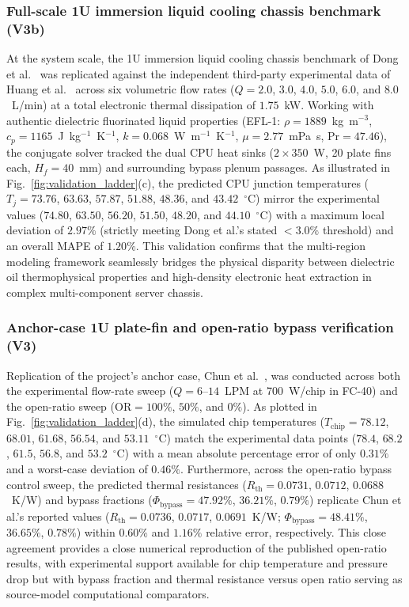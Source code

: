 \subsubsection{Full-scale 1U immersion liquid cooling chassis benchmark (V3b)}
\label{sec:vv-v3b-discussion}

At the system scale, the 1U immersion liquid cooling chassis benchmark of Dong et al.~\cite{dong2026} was replicated against the independent third-party experimental data of Huang et al.~\cite{huang2024energy} across six volumetric flow rates ($Q = 2.0$, $3.0$, $4.0$, $5.0$, $6.0$, and $8.0$~L/min) at a total electronic thermal dissipation of $1.75$~kW. Working with authentic dielectric fluorinated liquid properties (EFL-1: $\rho = 1889$~kg~m$^{-3}$, $c_p = 1165$~J~kg$^{-1}$~K$^{-1}$, $k = 0.068$~W~m$^{-1}$~K$^{-1}$, $\mu = 2.77$~mPa~s, $\mathrm{Pr} = 47.46$), the conjugate solver tracked the dual CPU heat sinks ($2 \times 350$~W, 20 plate fins each, $H_f = 40$~mm) and surrounding bypass plenum passages. As illustrated in Fig.~\ref{fig:validation_ladder}(c), the predicted CPU junction temperatures ($T_j = 73.76$, $63.63$, $57.87$, $51.88$, $48.36$, and $43.42$~$^{\circ}$C) mirror the experimental values ($74.80$, $63.50$, $56.20$, $51.50$, $48.20$, and $44.10$~$^{\circ}$C) with a maximum local deviation of $2.97\%$ (strictly meeting Dong et al.'s stated $<3.0\%$ threshold) and an overall MAPE of $1.20\%$. This validation confirms that the multi-region modeling framework seamlessly bridges the physical disparity between dielectric oil thermophysical properties and high-density electronic heat extraction in complex multi-component server chassis.

\subsubsection{Anchor-case 1U plate-fin and open-ratio bypass verification (V3)}
\label{sec:vv-v3-discussion}

Replication of the project's anchor case, Chun et al.~\cite{chun2026}, was conducted across both the experimental flow-rate sweep ($Q = 6\text{--}14$~LPM at 700~W/chip in FC-40) and the open-ratio sweep ($\mathrm{OR} = 100\%$, $50\%$, and $0\%$). As plotted in Fig.~\ref{fig:validation_ladder}(d), the simulated chip temperatures ($T_{\mathrm{chip}} = 78.12$, $68.01$, $61.68$, $56.54$, and $53.11$~$^{\circ}$C) match the experimental data points ($78.4$, $68.2$, $61.5$, $56.8$, and $53.2$~$^{\circ}$C) with a mean absolute percentage error of only $0.31\%$ and a worst-case deviation of $0.46\%$. Furthermore, across the open-ratio bypass control sweep, the predicted thermal resistances ($R_{\mathrm{th}} = 0.0731$, $0.0712$, $0.0688$~K/W) and bypass fractions ($\Phi_{\mathrm{bypass}} = 47.92\%$, $36.21\%$, $0.79\%$) replicate Chun et al.'s reported values ($R_{\mathrm{th}} = 0.0736$, $0.0717$, $0.0691$~K/W; $\Phi_{\mathrm{bypass}} = 48.41\%$, $36.65\%$, $0.78\%$) within $0.60\%$ and $1.16\%$ relative error, respectively. This close agreement provides a close numerical reproduction of the published open-ratio results, with experimental support available for chip temperature and pressure drop but with bypass fraction and thermal resistance versus open ratio serving as source-model computational comparators.

